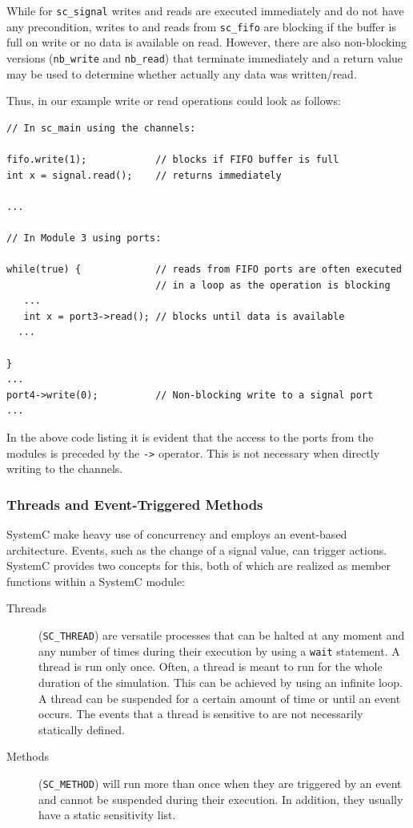 \documentclass{template/openetcs_article}
\begin{document}
While for \verb|sc_signal| writes and reads are executed immediately and do not have any precondition, writes to and reads from \verb|sc_fifo| are blocking if the buffer is full on write or no data is available on read. However, there are also non-blocking versions (\verb|nb_write| and \verb|nb_read|) that terminate immediately and a return value may be used to determine whether actually any data was written/read.

Thus, in our example write or read operations could look as follows:
{\small
\begin{lstlisting}
// In sc_main using the channels:

fifo.write(1);            // blocks if FIFO buffer is full
int x = signal.read();    // returns immediately

...

// In Module 3 using ports:

while(true) {             // reads from FIFO ports are often executed
                          // in a loop as the operation is blocking
   ...
   int x = port3->read(); // blocks until data is available
  ...

}
...
port4->write(0);          // Non-blocking write to a signal port
...
\end{lstlisting}
}

In the above code listing it is evident that the access to the ports from the modules is preceded by the \verb|->| operator. This is not necessary when directly writing to the channels.

\subsubsection{Threads and Event-Triggered Methods}

SystemC make heavy use of concurrency and employs an event-based architecture. Events, such as the change of a signal value, can trigger actions. SystemC provides two concepts for this, both of which are realized as member functions within a SystemC module:

\begin{description}
\item[Threads] (\verb|SC_THREAD|) are versatile processes that can be halted at any moment and any number of times during their execution by using a \verb|wait| statement. A thread is run only once. Often, a thread is meant to run for the whole duration of the simulation. This can be achieved by using an infinite loop. A thread can be suspended for a certain amount of time or until an event occurs. The events that a thread is sensitive to are not necessarily statically defined.
\item[Methods] (\verb|SC_METHOD|) will run more than once when they are triggered by an event and cannot be suspended during their execution. In addition, they usually have a static sensitivity list.
\end{description}
\end{document}

